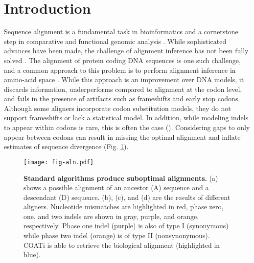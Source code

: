 \section*{Introduction}

Sequence alignment is a fundamental task in bioinformatics and a cornerstone step in comparative and functional genomic analysis \parencite{sequence_alignment_rosenberg_2009}. While sophisticated advances have been made, the challenge of alignment inference has not been fully solved \parencite{art_morrison_2015}.
%
The alignment of protein coding DNA sequences is one such challenge, and a common approach to this problem is to perform alignment inference in amino-acid space \parencite[e.g.][]{bininda2005transalign,abascal2010translatorx}.
While this approach is an improvement over DNA models, it discards information, underperforms compared to alignment at the codon level, and fails in the presence of artifacts such as frameshifts and early stop codons.
Although some aligners incorporate codon substitution models, they do not support frameshifts or lack a statistical model.
In addition, while modeling indels to appear within codons is rare, this is often the case ().
Considering gaps to only appear between codons can result in missing the optimal alignment and inflate estimates of sequence divergence (Fig. \ref{fig:aln}).

\begin{figure}[h!]
    \begin{minipage}[c]{0.65\textwidth}
        \texttt{[image: fig-aln.pdf]}
    \end{minipage}\hfill
    \begin{minipage}[c]{0.35\textwidth}
        \caption{
        \textbf{Standard algorithms produce suboptimal alignments.}
        (a) shows a possible alignment of an ancestor (A) sequence and a descendant (D) sequence.
        (b), (c), and (d) are the results of different aligners.
        Nucleotide mismatches are highlighted in red, phase zero, one, and two indels are shown in gray, purple, and orange, respectively.
        Phase one indel (purple) is also of type I (synonymous) while phase two indel (orange) is of type II (nonsynonymous). 
        COATi is able to retrieve the biological alignment (highlighted in blue).
        }
    \label{fig:aln}
    \end{minipage}
\end{figure}


